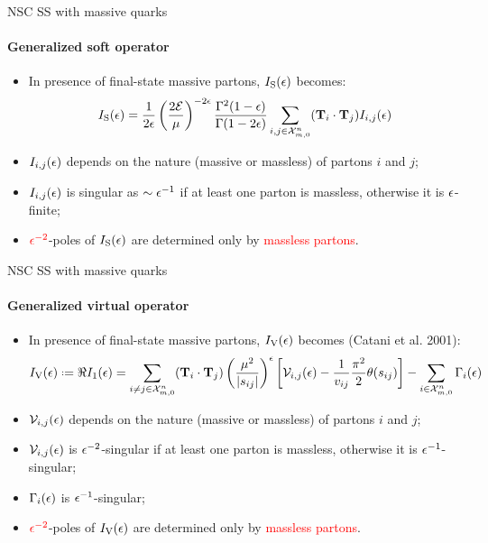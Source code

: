 
\begin{frame}{NSC SS with massive quarks}
  \framesubtitle{Generalized soft operator}

  \justifying
  \begin{itemize}[<+->]
    \item In presence of final-state massive partons, $ I_\text{S}(\epsilon) $ becomes:
    \begin{equation*}
      I_\text{S}(\epsilon) = \frac{1}{2\epsilon} \left( \frac{2\mathcal{E}}{\mu} \right)^{-2\epsilon} \frac{\Gamma^2(1-\epsilon)}{\Gamma(1-2\epsilon)} \sum_{i,j \in \mathcal{X}^{n}_{m,0}} (\mathbf{T}_i \cdot \mathbf{T}_j) I_{i,j}(\epsilon)
    \end{equation*}
    \item $ I_{i,j}(\epsilon) $ depends on the nature (massive or massless) of partons $ i $ and $ j $;
    \item $ I_{i,j}(\epsilon) $ is singular as $ \sim \epsilon^{-1} $ if at least one parton is massless, otherwise it is $ \epsilon $-finite;
    \item $ \textcolor{red}{\epsilon^{-2}} $-poles of $ I_\text{S}(\epsilon) $ are determined only by \textcolor{red}{massless partons}.
  \end{itemize}

\end{frame}


\begin{frame}{NSC SS with massive quarks}
  \framesubtitle{Generalized virtual operator}

  \justifying
  \begin{itemize}[<+->]
    \item In presence of final-state massive partons, $ I_\text{V}(\epsilon) $ becomes (Catani et al. 2001):
    \begin{equation*}
      \ivo(\de) \defeq \Re \ioo(\de) = \sum_{i \neq j \in \fsp{n}{m}} (\cc) \left( \frac{\mu^2}{\abs{s_{ij}}} \right)^\de \left[ \ns_{i,j}(\de) - \frac{1}{v_{ij}} \frac{\pi^2}{2} \theta(s_{ij}) \right] - \sum_{i \in \fsp{n}{m}} \Gamma_i(\de)
    \end{equation*}
    \item $ \mathcal{V}_{i,j}(\epsilon) $ depends on the nature (massive or massless) of partons $ i $ and $ j $;
    \item $ \mathcal{V}_{i,j}(\epsilon) $ is $ \epsilon^{-2} $-singular if at least one parton is massless, otherwise it is $ \epsilon^{-1} $-singular;
    \item $ \Gamma_i(\epsilon) $ is $ \epsilon^{-1} $-singular;
    \item $ \textcolor{red}{\epsilon^{-2}} $-poles of $ I_\text{V}(\epsilon) $ are determined only by \textcolor{red}{massless partons}.
  \end{itemize}

\end{frame}

